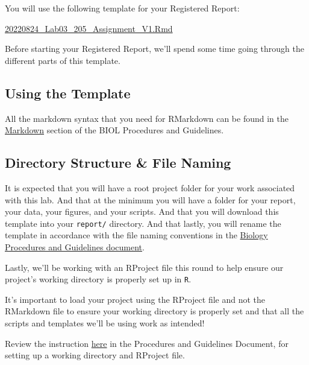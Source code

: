 \documentclass[
]{book}
\begin{document}
You will use the following template for your Registered Report:

\href{https://osf.io/download/g5zxk}{20220824\_Lab03\_205\_Assignment\_V1.Rmd}

Before starting your Registered Report, we'll spend some time going through the different parts of this template.

\hypertarget{using-the-template}{%
\subsection*{Using the Template}\label{using-the-template}}

All the markdown syntax that you need for RMarkdown can be found in the \href{https://ubco-biology.github.io/Procedures-and-Guidelines/markdown-1.html}{Markdown} section of the BIOL Procedures and Guidelines.

\hypertarget{directory-structure-file-naming}{%
\subsection*{Directory Structure \& File Naming}\label{directory-structure-file-naming}}

It is expected that you will have a root project folder for your work associated with this lab. And that at the minimum you will have a folder for your report, your data, your figures, and your scripts. And that you will download this template into your \texttt{report/} directory. And that lastly, you will rename the template in accordance with the file naming conventions in the \href{https://ubco-biology.github.io/Procedures-and-Guidelines/file-naming.html}{Biology Procedures and Guidelines document}.

Lastly, we'll be working with an RProject file this round to help ensure our project's working directory is properly set up in \texttt{R}.

It's important to load your project using the RProject file and not the RMarkdown file to ensure your working directory is properly set and that all the scripts and templates we'll be using work as intended!

Review the instruction \href{https://ubco-biology.github.io/Procedures-and-Guidelines/set-a-working-directory-in-rstudio.html}{here} in the Procedures and Guidelines Document, for setting up a working directory and RProject file.
\end{document}
